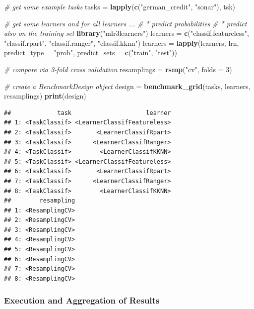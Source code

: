 \documentclass[]{article}
\newenvironment{Shaded}{\begin{snugshade}}{\end{snugshade}}
\newcommand{\CommentTok}[1]{\textcolor[rgb]{0.56,0.35,0.01}{\textit{#1}}}
\newcommand{\DataTypeTok}[1]{\textcolor[rgb]{0.13,0.29,0.53}{#1}}
\newcommand{\DecValTok}[1]{\textcolor[rgb]{0.00,0.00,0.81}{#1}}
\newcommand{\KeywordTok}[1]{\textcolor[rgb]{0.13,0.29,0.53}{\textbf{#1}}}
\newcommand{\NormalTok}[1]{#1}
\newcommand{\StringTok}[1]{\textcolor[rgb]{0.31,0.60,0.02}{#1}}
\renewenvironment{Shaded} {\begin{snugshade}\small} {\end{snugshade}}
\begin{document}
\begin{Shaded}
\begin{Highlighting}[]
\CommentTok{# get some example tasks}
\NormalTok{tasks =}\StringTok{ }\KeywordTok{lapply}\NormalTok{(}\KeywordTok{c}\NormalTok{(}\StringTok{"german_credit"}\NormalTok{, }\StringTok{"sonar"}\NormalTok{), tsk)}

\CommentTok{# get some learners and for all learners ...}
\CommentTok{# * predict probabilities}
\CommentTok{# * predict also on the training set}
\KeywordTok{library}\NormalTok{(}\StringTok{"mlr3learners"}\NormalTok{)}
\NormalTok{learners =}\StringTok{ }\KeywordTok{c}\NormalTok{(}\StringTok{"classif.featureless"}\NormalTok{, }\StringTok{"classif.rpart"}\NormalTok{, }\StringTok{"classif.ranger"}\NormalTok{, }\StringTok{"classif.kknn"}\NormalTok{)}
\NormalTok{learners =}\StringTok{ }\KeywordTok{lapply}\NormalTok{(learners, lrn,}
  \DataTypeTok{predict_type =} \StringTok{"prob"}\NormalTok{, }\DataTypeTok{predict_sets =} \KeywordTok{c}\NormalTok{(}\StringTok{"train"}\NormalTok{, }\StringTok{"test"}\NormalTok{))}

\CommentTok{# compare via 3-fold cross validation}
\NormalTok{resamplings =}\StringTok{ }\KeywordTok{rsmp}\NormalTok{(}\StringTok{"cv"}\NormalTok{, }\DataTypeTok{folds =} \DecValTok{3}\NormalTok{)}

\CommentTok{# create a BenchmarkDesign object}
\NormalTok{design =}\StringTok{ }\KeywordTok{benchmark_grid}\NormalTok{(tasks, learners, resamplings)}
\KeywordTok{print}\NormalTok{(design)}
\end{Highlighting}
\end{Shaded}

\begin{verbatim}
##             task                     learner
## 1: <TaskClassif> <LearnerClassifFeatureless>
## 2: <TaskClassif>       <LearnerClassifRpart>
## 3: <TaskClassif>      <LearnerClassifRanger>
## 4: <TaskClassif>        <LearnerClassifKKNN>
## 5: <TaskClassif> <LearnerClassifFeatureless>
## 6: <TaskClassif>       <LearnerClassifRpart>
## 7: <TaskClassif>      <LearnerClassifRanger>
## 8: <TaskClassif>        <LearnerClassifKKNN>
##        resampling
## 1: <ResamplingCV>
## 2: <ResamplingCV>
## 3: <ResamplingCV>
## 4: <ResamplingCV>
## 5: <ResamplingCV>
## 6: <ResamplingCV>
## 7: <ResamplingCV>
## 8: <ResamplingCV>
\end{verbatim}

\hypertarget{bm-exec}{%
\subsubsection{Execution and Aggregation of Results}\label{bm-exec}}
\end{document}
